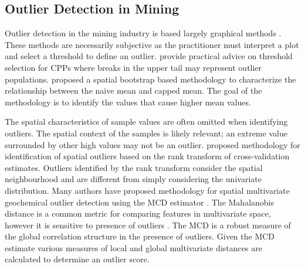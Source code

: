
\FloatBarrier
\subsection{Outlier Detection in Mining}
\label{subsec:01miningoutlier}

Outlier detection in the mining industry is based largely graphical methods \citep{leuangthong2015dealing, silva2021classification}. These methods are necessarily subjective as the practitioner must interpret a plot and select a threshold to define an outlier. \cite{leuangthong2015dealing,nowak2013suggestions,rossi2013mineral} provide practical advice on threshold selection for \glspl{CPP} where breaks in the upper tail may represent outlier populations. \cite{babakhani2014geostatistical} proposed a spatial bootstrap based methodology to characterize the relationship between the naive mean and capped mean. The goal of the methodology is to identify the values that cause higher mean values.

The spatial characteristics of sample values are often omitted when identifying outliers. The spatial context of the samples is likely relevant; an extreme value surrounded by other high values may not be an outlier. \cite{babakhani2014geostatistical} proposed methodology for identification of spatial outliers based on the rank transform of cross-validation estimates. Outliers identified by the rank transform consider the spatial neighbourhood and are different from simply considering the univariate distribution. Many authors \citep{filzmoser2020multivariate,filzmoser2005multivariate,ernst2017comparison, leung2021sample, harris2014multivariate} have proposed methodology for spatial multivariate geochemical outlier detection using the \gls{MCD} estimator \citep{rousseeuw1999fast}. The Mahalanobis distance is a common metric for comparing features in multivariate space, however it is sensitive to presence of outliers \citep{filzmoser2005multivariate}. The \gls{MCD} is a robust measure of the global correlation structure in the presence of outliers. Given the \gls{MCD} estimate various measures of local and global multivariate distances are calculated to determine an outlier score.

